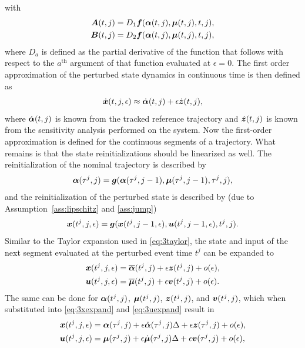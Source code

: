 \documentclass[../DC2017114Bouma.tex]{subfiles}
\begin{document}
with
\begin{align}
{\boldsymbol{A}}(t,j) &= D_1{\boldsymbol{f}}(\boldsymbol{\alpha}(t,j),\boldsymbol{\mu}(t,j),t,j),\\
{\boldsymbol{B}}(t,j) &= D_2{\boldsymbol{f}}(\boldsymbol{\alpha}(t,j),\boldsymbol{\mu}(t,j),t,j),
\end{align}
where $D_a$ is defined as the partial derivative of the function that follows with respect to the $a^{\text{th}}$ argument of that function evaluated at $\epsilon = 0$. The first order approximation of the perturbed state dynamics in continuous time is then defined as
\begin{align}
\dot{{\boldsymbol{x}}}(t,j,\epsilon) \approx \dot{\boldsymbol{\alpha}}(t,j) + \epsilon\dot{{\boldsymbol{z}}}(t,j),
\end{align}
where $\dot{\boldsymbol{\alpha}}(t,j)$ is known from the tracked reference trajectory and $\dot{{\boldsymbol{z}}}(t,j)$ is known from the sensitivity analysis performed on the system. Now the first-order approximation is defined for the continuous segments of a trajectory. What remains is that the state reinitializations should be linearized as well. The reinitialization of the nominal trajectory is described by
\begin{align}
\boldsymbol{\alpha}(\tau^j,j) = {\boldsymbol{g}}(\boldsymbol{\alpha}(\tau^j,j-1),\boldsymbol{\mu}(\tau^j,j-1),\tau^j,j),\label{eq:3g}
\end{align}
and the reinitialization of the perturbed state is described by (due to Assumption~\ref{ass:lipschitz} and \ref{ass:jump})
\begin{align}
{\boldsymbol{x}}(t^{j},j,\epsilon) = {\boldsymbol{g}}({\boldsymbol{x}}(t^{j},j-1,\epsilon),{\boldsymbol{u}}(t^{j},j-1,\epsilon),t^{j},j).
\end{align}
Similar to the Taylor expansion used in \eqref{eq:3taylor}, the state and input of the next segment evaluated at the perturbed event time $t^{j}$ can be expanded to
\begin{align}
{\boldsymbol{x}}(t^{j},j,\epsilon) &= \overline{\boldsymbol{\alpha}}(t^{j},j) + \epsilon{\boldsymbol{z}}(t^{j},j) + o(\epsilon),\label{eq:3xexpand}\\
{\boldsymbol{u}}(t^{j},j,\epsilon) &= \overline{\boldsymbol{\mu}}(t^{j},j) + \epsilon{\boldsymbol{v}}(t^{j},j) + o(\epsilon).\label{eq:3uexpand}
\end{align}
The same can be done for $\boldsymbol{\alpha}(t^{j},j)$, $\boldsymbol{\mu}(t^{j},j)$, ${\boldsymbol{z}}(t^{j},j)$, and ${\boldsymbol{v}}(t^{j},j)$, which when substituted into \eqref{eq:3xexpand} and \eqref{eq:3uexpand} result in
\begin{align}
{\boldsymbol{x}}(t^{j},j,\epsilon) &= \boldsymbol{\alpha}(\tau^j,j) + \epsilon\dot{\boldsymbol{\alpha}}(\tau^j,j)\Delta + \epsilon{\boldsymbol{z}}(\tau^j,j) + o(\epsilon),\label{eq:3xexpand2}\\
{\boldsymbol{u}}(t^{j},j,\epsilon) &= \boldsymbol{\mu}(\tau^j,j) + \epsilon\dot{\boldsymbol{\mu}}(\tau^j,j)\Delta + \epsilon{\boldsymbol{v}}(\tau^j,j) + o(\epsilon),\label{eq:3uexpand2}
\end{align}
\end{document}
